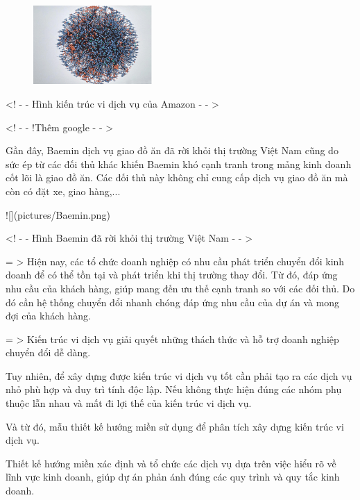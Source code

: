 \begin{figure}[h]

\centering

\includegraphics[height = 3cm]{pictures/KienTrucViDichVuAmazon.png}


\end{figure}

<! - - Hình kiến trúc vi dịch vụ của Amazon - - >

<! - - !Thêm google - - >

Gần đây, Baemin dịch vụ giao đồ ăn đã rời khỏi thị trường Việt Nam cũng do sức ép từ các đối thủ khác khiến Baemin khó cạnh tranh trong mảng kinh doanh cốt lõi là giao đồ ăn. Các đối thủ này không chỉ cung cấp dịch vụ giao đồ ăn mà còn có đặt xe, giao hàng,...

![](pictures/Baemin.png)

<! - - Hình Baemin đã rời khỏi thị trường Việt Nam - - >

= > Hiện nay, các tổ chức doanh nghiệp có nhu cầu phát triển chuyển đổi kinh doanh để có thể tồn tại và phát triển khi thị trường thay đổi. Từ đó, đáp ứng nhu cầu của khách hàng, giúp mang đến ưu thế cạnh tranh so với các đối thủ. Do đó cần hệ thống chuyển đổi nhanh chóng đáp ứng nhu cầu của dự án và mong đợi của khách hàng.

= > Kiến trúc vi dịch vụ giải quyết những thách thức và hỗ trợ doanh nghiệp chuyển đổi dễ dàng.

Tuy nhiên, để xây dựng được kiến trúc vi dịch vụ tốt cần phải tạo ra các dịch vụ nhỏ phù hợp và duy trì tính độc lập. Nếu không thực hiện đúng các nhóm phụ thuộc lẫn nhau và mất đi lợi thế của kiến trúc vi dịch vụ.

Và từ đó, mẫu thiết kế hướng miền sử dụng để phân tích xây dựng kiến trúc vi dịch vụ.

Thiết kế hướng miền xác định và tổ chức các dịch vụ dựa trên việc hiểu rõ về lĩnh vực kinh doanh, giúp dự án phản ánh đúng các quy trình và quy tắc kinh doanh.

